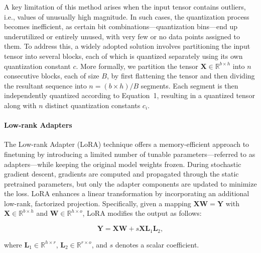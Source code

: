 A key limitation of this method arises when the input tensor contains outliers, i.e., values of unusually high magnitude. In such cases, the quantization process becomes inefficient, as certain bit combinations—quantization bins—end up underutilized or entirely unused, with very few or no data points assigned to them. To address this, a widely adopted solution involves partitioning the input tensor into several blocks, each of which is quantized separately using its own quantization constant $c$. More formally, we partition the tensor $\mathbf{X}\in \mathbb{R}^{b\times h}$ into $n$ consecutive blocks, each of size $B$, by first flattening the tensor and then dividing the resultant sequence into ${n = ({b\times h} )/{B} }$ segments. Each segment is then independently quantized according to Equation~1, resulting in a quantized tensor along with $n$ distinct quantization constants $c_i$.

\paragraph{Low-rank Adapters} The Low-rank Adapter (LoRA) technique \citep{hu2021lora} offers a memory-efficient approach to finetuning by introducing a limited number of tunable parameters—referred to as adapters—while keeping the original model weights frozen. During stochastic gradient descent, gradients are computed and propagated through the static pretrained parameters, but only the adapter components are updated to minimize the loss. LoRA enhances a linear transformation by incorporating an additional low-rank, factorized projection. Specifically, given a mapping ${\mathbf{X} \mathbf{W} = \mathbf{Y}}$ with $\mathbf{X}\in  \mathbb{R}^{b\times h}$ and $\mathbf{W}\in  \mathbb{R}^{h\times o}$, LoRA modifies the output as follows:

\begin{equation}
    \mathbf{Y} = \mathbf{X}\mathbf{W} + s\mathbf{X}\mathbf{L}_1\mathbf{L}_2,
\end{equation}

where $\mathbf{L}_1\in  \mathbb{R}^{h\times r}$, $\mathbf{L}_2\in  \mathbb{R}^{r\times o}$, and $s$ denotes a scalar coefficient.

